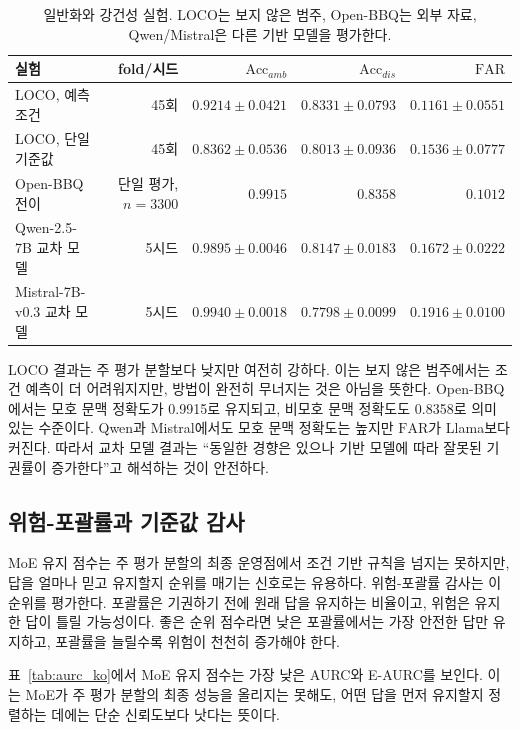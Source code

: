 \documentclass{ieeeaccess}
\newcommand{\accamb}{\mathrm{Acc}_{amb}}
\newcommand{\accdis}{\mathrm{Acc}_{dis}}
\newcommand{\far}{\mathrm{FAR}}
\begin{document}
\begin{table}[t]
\caption{일반화와 강건성 실험. LOCO는 보지 않은 범주, Open-BBQ는 외부 자료, Qwen/Mistral은 다른 기반 모델을 평가한다.}
\label{tab:generalization_ko}
\centering
\footnotesize
\setlength{\tabcolsep}{6pt}
\begin{tabular}{lrrrr}
\toprule
실험 & fold/시드 & $\accamb$ & $\accdis$ & $\far$ \\
\midrule
LOCO, 예측 조건 & 45회 & $0.9214\pm0.0421$ & $0.8331\pm0.0793$ & $0.1161\pm0.0551$ \\
LOCO, 단일 기준값 & 45회 & $0.8362\pm0.0536$ & $0.8013\pm0.0936$ & $0.1536\pm0.0777$ \\
Open-BBQ 전이 & 단일 평가, $n=3300$ & $0.9915$ & $0.8358$ & $0.1012$ \\
Qwen-2.5-7B 교차 모델 & 5시드 & $0.9895\pm0.0046$ & $0.8147\pm0.0183$ & $0.1672\pm0.0222$ \\
Mistral-7B-v0.3 교차 모델 & 5시드 & $0.9940\pm0.0018$ & $0.7798\pm0.0099$ & $0.1916\pm0.0100$ \\
\bottomrule
\end{tabular}
\end{table}

LOCO 결과는 주 평가 분할보다 낮지만 여전히 강하다. 이는 보지 않은 범주에서는 조건 예측이 더 어려워지지만, 방법이 완전히 무너지는 것은 아님을 뜻한다. Open-BBQ에서는 모호 문맥 정확도가 0.9915로 유지되고, 비모호 문맥 정확도도 0.8358로 의미 있는 수준이다. Qwen과 Mistral에서도 모호 문맥 정확도는 높지만 $\far$가 Llama보다 커진다. 따라서 교차 모델 결과는 ``동일한 경향은 있으나 기반 모델에 따라 잘못된 기권률이 증가한다''고 해석하는 것이 안전하다.

\subsection{위험-포괄률과 기준값 감사}
MoE 유지 점수는 주 평가 분할의 최종 운영점에서 조건 기반 규칙을 넘지는 못하지만, 답을 얼마나 믿고 유지할지 순위를 매기는 신호로는 유용하다. 위험-포괄률 감사는 이 순위를 평가한다. 포괄률은 기권하기 전에 원래 답을 유지하는 비율이고, 위험은 유지한 답이 틀릴 가능성이다. 좋은 순위 점수라면 낮은 포괄률에서는 가장 안전한 답만 유지하고, 포괄률을 늘릴수록 위험이 천천히 증가해야 한다.

표~\ref{tab:aurc_ko}에서 MoE 유지 점수는 가장 낮은 AURC와 E-AURC를 보인다. 이는 MoE가 주 평가 분할의 최종 성능을 올리지는 못해도, 어떤 답을 먼저 유지할지 정렬하는 데에는 단순 신뢰도보다 낫다는 뜻이다.
\end{document}
